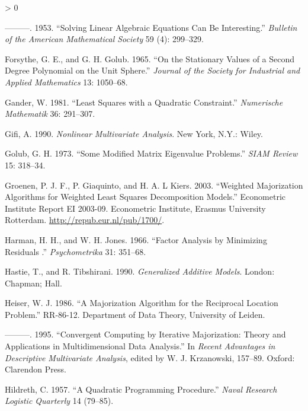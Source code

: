 \documentclass[
  12pt,
]{book}
\newlength{\cslhangindent}
\newenvironment{CSLReferences}[2] %
 {%
  \setlength{\parindent}{0pt}
  \ifodd #1 \everypar{\setlength{\hangindent}{\cslhangindent}}\ignorespaces\fi
  \ifnum #2 > 0
  \setlength{\parskip}{#2\baselineskip}
  \fi
 }%
 {}
\begin{document}
\begin{CSLReferences}{1}{0}
\leavevmode\hypertarget{ref-forsythe_53}{}%
---------. 1953. {``{Solving Linear Algebraic Equations Can Be Interesting}.''} \emph{Bulletin of the American Mathematical Society} 59 (4): 299--329.

\leavevmode\hypertarget{ref-forsythe_golub_65}{}%
Forsythe, G. E., and G. H. Golub. 1965. {``{On the Stationary Values of a Second Degree Polynomial on the Unit Sphere}.''} \emph{Journal of the Society for Industrial and Applied Mathematics} 13: 1050--68.

\leavevmode\hypertarget{ref-gander_81}{}%
Gander, W. 1981. {``{Least Squares with a Quadratic Constraint}.''} \emph{Numerische Mathematik} 36: 291--307.

\leavevmode\hypertarget{ref-gifi_B_90}{}%
Gifi, A. 1990. \emph{Nonlinear Multivariate Analysis}. New York, N.Y.: Wiley.

\leavevmode\hypertarget{ref-golub_73}{}%
Golub, G. H. 1973. {``{Some Modified Matrix Eigenvalue Problems}.''} \emph{{SIAM} Review} 15: 318--34.

\leavevmode\hypertarget{ref-groenen_giaquinto_kiers_03}{}%
Groenen, P. J. F., P. Giaquinto, and H. A. L Kiers. 2003. {``{Weighted Majorization Algorithms for Weighted Least Squares Decomposition Models}.''} Econometric Institute Report EI 2003-09. Econometric Institute, Erasmus University Rotterdam. \url{http://repub.eur.nl/pub/1700/}.

\leavevmode\hypertarget{ref-harman_jones_66}{}%
Harman, H. H., and W. H. Jones. 1966. {``{Factor Analysis by Minimizing Residuals }.''} \emph{Psychometrika} 31: 351--68.

\leavevmode\hypertarget{ref-hastie_tibshirani_90}{}%
Hastie, T., and R. Tibshirani. 1990. \emph{Generalized Additive Models}. London: Chapman; Hall.

\leavevmode\hypertarget{ref-heiser_86}{}%
Heiser, W. J. 1986. {``{A Majorization Algorithm for the Reciprocal Location Problem}.''} RR-86-12. Department of Data Theory, University of Leiden.

\leavevmode\hypertarget{ref-heiser_95}{}%
---------. 1995. {``{Convergent Computing by Iterative Majorization: Theory and Applications in Multidimensional Data Analysis}.''} In \emph{Recent Advantages in Descriptive Multivariate Analysis}, edited by W. J. Krzanowski, 157--89. Oxford: Clarendon Press.

\leavevmode\hypertarget{ref-hildreth_57}{}%
Hildreth, C. 1957. {``{A Quadratic Programming Procedure}.''} \emph{Naval Research Logistic Quarterly} 14 (79--85).


\end{CSLReferences}
\end{document}
